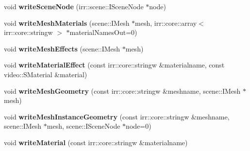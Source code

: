 \begin{DoxyCompactItemize}
\item 
\hypertarget{classirr_1_1scene_1_1_c_collada_mesh_writer_a9469c8d8bbf46c733d2efb25dee40ac7}{void {\bfseries write\-Scene\-Node} (irr\-::scene\-::\-I\-Scene\-Node $\ast$node)}\label{classirr_1_1scene_1_1_c_collada_mesh_writer_a9469c8d8bbf46c733d2efb25dee40ac7}

\item 
\hypertarget{classirr_1_1scene_1_1_c_collada_mesh_writer_a96236500ea42b399bd3ed147c90eaea7}{void {\bfseries write\-Mesh\-Materials} (scene\-::\-I\-Mesh $\ast$mesh, irr\-::core\-::array$<$ irr\-::core\-::stringw $>$ $\ast$material\-Names\-Out=0)}\label{classirr_1_1scene_1_1_c_collada_mesh_writer_a96236500ea42b399bd3ed147c90eaea7}

\item 
\hypertarget{classirr_1_1scene_1_1_c_collada_mesh_writer_ac3d967aac0d94e66ca203b0d5942c3b1}{void {\bfseries write\-Mesh\-Effects} (scene\-::\-I\-Mesh $\ast$mesh)}\label{classirr_1_1scene_1_1_c_collada_mesh_writer_ac3d967aac0d94e66ca203b0d5942c3b1}

\item 
\hypertarget{classirr_1_1scene_1_1_c_collada_mesh_writer_a9ea7c39daa3f8d970a1f1903e8b9faaf}{void {\bfseries write\-Material\-Effect} (const irr\-::core\-::stringw \&materialname, const video\-::\-S\-Material \&material)}\label{classirr_1_1scene_1_1_c_collada_mesh_writer_a9ea7c39daa3f8d970a1f1903e8b9faaf}

\item 
\hypertarget{classirr_1_1scene_1_1_c_collada_mesh_writer_a9b97b733faa2968f0a8521dbea22b34d}{void {\bfseries write\-Mesh\-Geometry} (const irr\-::core\-::stringw \&meshname, scene\-::\-I\-Mesh $\ast$mesh)}\label{classirr_1_1scene_1_1_c_collada_mesh_writer_a9b97b733faa2968f0a8521dbea22b34d}

\item 
\hypertarget{classirr_1_1scene_1_1_c_collada_mesh_writer_a8f9bb5a388062e8ff4d106d3859238ee}{void {\bfseries write\-Mesh\-Instance\-Geometry} (const irr\-::core\-::stringw \&meshname, scene\-::\-I\-Mesh $\ast$mesh, scene\-::\-I\-Scene\-Node $\ast$node=0)}\label{classirr_1_1scene_1_1_c_collada_mesh_writer_a8f9bb5a388062e8ff4d106d3859238ee}

\item 
\hypertarget{classirr_1_1scene_1_1_c_collada_mesh_writer_a164b1c2384ba75fe10375cf2efa46da4}{void {\bfseries write\-Material} (const irr\-::core\-::stringw \&materialname)}\label{classirr_1_1scene_1_1_c_collada_mesh_writer_a164b1c2384ba75fe10375cf2efa46da4}


\end{DoxyCompactItemize}
